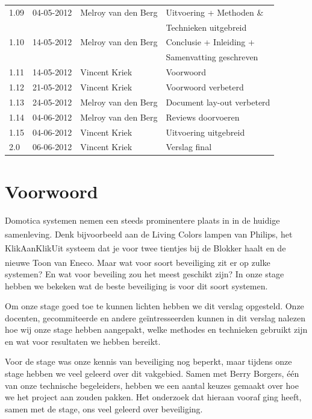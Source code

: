 \documentclass[]{article}
\begin{document}
\begin{tabular}{|| l | l | l | l ||}
    1.09    &04-05-2012  &Melroy van den Berg &Uitvoering + Methoden \&        \\ 
            &            &                    &Technieken uitgebreid           \\\hline
    1.10    &14-05-2012  &Melroy van den Berg &Conclusie + Inleiding +         \\
            &            &                    &Samenvatting geschreven         \\\hline 
    1.11    &14-05-2012  &Vincent Kriek       &Voorwoord                       \\\hline
    1.12    &21-05-2012  &Vincent Kriek       &Voorwoord verbeterd             \\\hline
    1.13    &24-05-2012  &Melroy van den Berg &Document lay-out verbeterd      \\\hline
    1.14    &04-06-2012  &Melroy van den Berg &Reviews doorvoeren	           \\\hline
    1.15    &04-06-2012  &Vincent Kriek       &Uitvoering uitgebreid           \\\hline
    2.0     &06-06-2012  &Vincent Kriek       &Verslag final                   \\\hline
\end{tabular}

\newpage
\thispagestyle{empty}
\section*{Voorwoord}
Domotica systemen nemen een steeds prominentere plaats in in de huidige
samenleving. Denk bijvoorbeeld aan de Living Colors lampen van
Philips\textsuperscript{\texttrademark}, het
KlikAanKlikUit\textsuperscript{\textregistered} systeem dat je voor twee
tientjes bij de Blokker haalt en de nieuwe
Toon\textsuperscript{\textregistered} van Eneco. Maar wat voor soort beveiliging
zit er op zulke systemen?  En wat voor beveiling zou het meest geschikt zijn? In
onze stage hebben we bekeken wat de beste beveiliging is voor dit soort
systemen.

Om onze stage goed toe te kunnen lichten hebben we dit
verslag opgesteld.  Onze docenten, gecommiteerde en andere ge\"intresseerden
kunnen in dit verslag nalezen hoe wij onze stage hebben aangepakt, welke
methodes en technieken gebruikt zijn en wat voor resultaten we hebben
bereikt.

Voor de stage was onze kennis van beveiliging nog beperkt,
maar tijdens onze stage hebben we veel geleerd over dit vakgebied. Samen met
Berry Borgers, \'e\'en van onze technische begeleiders, hebben we een aantal keuzes
gemaakt over hoe we het project aan zouden pakken. Het onderzoek dat hieraan
vooraf ging heeft, samen met de stage, ons veel geleerd over beveiliging.
\end{document}
